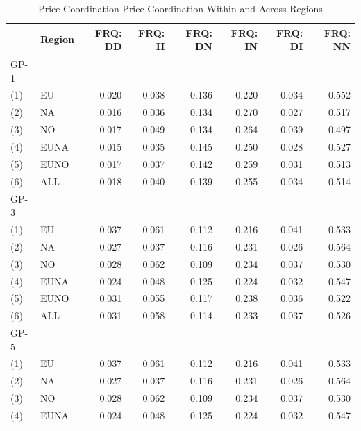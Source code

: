\begin{table}[H]
	\caption{Price Coordination Price Coordination Within and Across Regions}\label{tbl4}
	\begin{tabular}{llrrrrrr}
		\hline\hline
		& Region & FRQ: DD & FRQ: II & FRQ: DN & FRQ: IN & FRQ: DI & FRQ: NN \\ \hline\hline
		GP-1  &        &         &         &         &         &         &         \\
		(1)   & EU     &   0.020 &   0.038 &   0.136 &   0.220 &   0.034 &   0.552 \\
		(2)   & NA     &   0.016 &   0.036 &   0.134 &   0.270 &   0.027 &   0.517 \\
		(3)   & NO     &   0.017 &   0.049 &   0.134 &   0.264 &   0.039 &   0.497 \\
		(4)   & EUNA   &   0.015 &   0.035 &   0.145 &   0.250 &   0.028 &   0.527 \\
		(5)   & EUNO   &   0.017 &   0.037 &   0.142 &   0.259 &   0.031 &   0.513 \\
		(6)   & ALL    &   0.018 &   0.040 &   0.139 &   0.255 &   0.034 &   0.514 \\ \hline
		GP-3  &        &         &         &         &         &         &         \\
		(1)   & EU     &   0.037 &   0.061 &   0.112 &   0.216 &   0.041 &   0.533 \\
		(2)   & NA     &   0.027 &   0.037 &   0.116 &   0.231 &   0.026 &   0.564 \\
		(3)   & NO     &   0.028 &   0.062 &   0.109 &   0.234 &   0.037 &   0.530 \\
		(4)   & EUNA   &   0.024 &   0.048 &   0.125 &   0.224 &   0.032 &   0.547 \\
		(5)   & EUNO   &   0.031 &   0.055 &   0.117 &   0.238 &   0.036 &   0.522 \\
		(6)   & ALL    &   0.031 &   0.058 &   0.114 &   0.233 &   0.037 &   0.526 \\ \hline
		GP-5  &        &         &         &         &         &         &         \\
		(1)   & EU     &   0.037 &   0.061 &   0.112 &   0.216 &   0.041 &   0.533 \\
		(2)   & NA     &   0.027 &   0.037 &   0.116 &   0.231 &   0.026 &   0.564 \\
		(3)   & NO     &   0.028 &   0.062 &   0.109 &   0.234 &   0.037 &   0.530 \\
		(4)   & EUNA   &   0.024 &   0.048 &   0.125 &   0.224 &   0.032 &   0.547 \\

\end{tabular}
\end{table}
